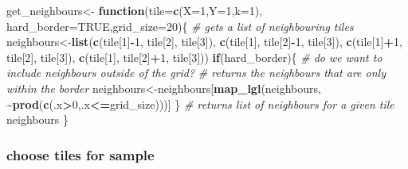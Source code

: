 \documentclass[
]{article}
\newenvironment{Shaded}{\begin{snugshade}}{\end{snugshade}}
\newcommand{\AttributeTok}[1]{\textcolor[rgb]{0.13,0.29,0.53}{#1}}
\newcommand{\CommentTok}[1]{\textcolor[rgb]{0.56,0.35,0.01}{\textit{#1}}}
\newcommand{\ConstantTok}[1]{\textcolor[rgb]{0.56,0.35,0.01}{#1}}
\newcommand{\ControlFlowTok}[1]{\textcolor[rgb]{0.13,0.29,0.53}{\textbf{#1}}}
\newcommand{\DecValTok}[1]{\textcolor[rgb]{0.00,0.00,0.81}{#1}}
\newcommand{\FunctionTok}[1]{\textcolor[rgb]{0.13,0.29,0.53}{\textbf{#1}}}
\newcommand{\NormalTok}[1]{#1}
\newcommand{\OtherTok}[1]{\textcolor[rgb]{0.56,0.35,0.01}{#1}}
\newcommand{\SpecialCharTok}[1]{\textcolor[rgb]{0.81,0.36,0.00}{\textbf{#1}}}
\begin{document}
\begin{Shaded}
\begin{Highlighting}[]
\NormalTok{get\_neighbours}\OtherTok{\textless{}{-}} \ControlFlowTok{function}\NormalTok{(}\AttributeTok{tile=}\FunctionTok{c}\NormalTok{(}\AttributeTok{X=}\DecValTok{1}\NormalTok{,}\AttributeTok{Y=}\DecValTok{1}\NormalTok{,}\AttributeTok{k=}\DecValTok{1}\NormalTok{), }\AttributeTok{hard\_border=}\ConstantTok{TRUE}\NormalTok{,}\AttributeTok{grid\_size=}\DecValTok{20}\NormalTok{)\{}
  \CommentTok{\# gets a list of neighbouring tiles}
\NormalTok{  neighbours}\OtherTok{\textless{}{-}}\FunctionTok{list}\NormalTok{(}\FunctionTok{c}\NormalTok{(tile[}\DecValTok{1}\NormalTok{]}\SpecialCharTok{{-}}\DecValTok{1}\NormalTok{, tile[}\DecValTok{2}\NormalTok{],   tile[}\DecValTok{3}\NormalTok{]),}
                   \FunctionTok{c}\NormalTok{(tile[}\DecValTok{1}\NormalTok{],   tile[}\DecValTok{2}\NormalTok{]}\SpecialCharTok{{-}}\DecValTok{1}\NormalTok{, tile[}\DecValTok{3}\NormalTok{]),}
                   \FunctionTok{c}\NormalTok{(tile[}\DecValTok{1}\NormalTok{]}\SpecialCharTok{+}\DecValTok{1}\NormalTok{, tile[}\DecValTok{2}\NormalTok{],   tile[}\DecValTok{3}\NormalTok{]),}
                   \FunctionTok{c}\NormalTok{(tile[}\DecValTok{1}\NormalTok{],   tile[}\DecValTok{2}\NormalTok{]}\SpecialCharTok{+}\DecValTok{1}\NormalTok{, tile[}\DecValTok{3}\NormalTok{]))}
  \ControlFlowTok{if}\NormalTok{(hard\_border)\{}
    \CommentTok{\# do we want to include neighbours outside of the grid?}
    \CommentTok{\# returns the neighbours that are only within the border}
\NormalTok{    neighbours}\OtherTok{\textless{}{-}}\NormalTok{neighbours[}\FunctionTok{map\_lgl}\NormalTok{(neighbours, }\SpecialCharTok{\textasciitilde{}}\FunctionTok{prod}\NormalTok{(}\FunctionTok{c}\NormalTok{(.x}\SpecialCharTok{\textgreater{}}\DecValTok{0}\NormalTok{,.x}\SpecialCharTok{\textless{}=}\NormalTok{grid\_size)))]}
\NormalTok{  \}}
  \CommentTok{\# returns list of neighbours for a given tile }
\NormalTok{  neighbours}
\NormalTok{\}}
\end{Highlighting}
\end{Shaded}

\subsubsection{choose tiles for sample}\label{choose-tiles-for-sample}
\end{document}

